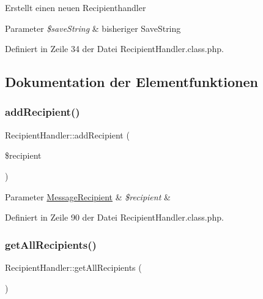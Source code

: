 Erstellt einen neuen Recipienthandler 
\begin{DoxyParams}{Parameter}
{\em \$save\+String} & bisheriger Save\+String \\
\hline
\end{DoxyParams}


Definiert in Zeile 34 der Datei Recipient\+Handler.\+class.\+php.



\subsection{Dokumentation der Elementfunktionen}
\mbox{\label{class_recipient_handler_aa12bbece1bc22c4fa0337f793d9198ca}} 
\subsubsection{\texorpdfstring{add\+Recipient()}{addRecipient()}}
{\footnotesize\ttfamily Recipient\+Handler\+::add\+Recipient (\begin{DoxyParamCaption}\item[{}]{\$recipient }\end{DoxyParamCaption})}


\begin{DoxyParams}[1]{Parameter}
\mbox{\hyperlink{class_message_recipient}{Message\+Recipient}} & {\em \$recipient} & \\
\hline
\end{DoxyParams}


Definiert in Zeile 90 der Datei Recipient\+Handler.\+class.\+php.

\mbox{\label{class_recipient_handler_ad9b32fff134b74e35ab26f98cbaad68e}} 
\subsubsection{\texorpdfstring{get\+All\+Recipients()}{getAllRecipients()}}
{\footnotesize\ttfamily Recipient\+Handler\+::get\+All\+Recipients (\begin{DoxyParamCaption}{ }\end{DoxyParamCaption})}

